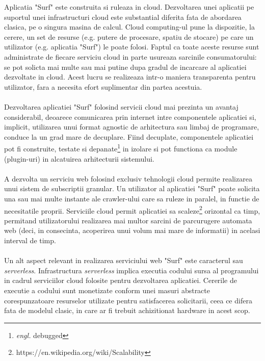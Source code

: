 Aplicatia "Surf" este construita si ruleaza in cloud. Dezvoltarea unei aplicatii pe suportul unei infrastructuri cloud este substantial diferita fata de abordarea clasica, pe o singura masina de calcul. Cloud computing-ul pune la dispozitie, la cerere, un set de resurse (e.g. putere de procesare, spatiu de stocare) pe care un utilizator (e.g. aplicatia "Surf") le poate folosi. Faptul ca toate aceste resurse sunt administrate de fiecare serviciu cloud in parte usureaza sarcinile consumatorului: se pot solicta mai multe sau mai putine dupa gradul de incarcare al aplicatiei dezvoltate in cloud. Acest lucru se realizeaza intr-o maniera transparenta pentru utilizator, fara a necesita efort suplimentar din partea acestuia.
\\
\\
Dezvoltarea aplicatiei "Surf" folosind servicii cloud mai prezinta un avantaj considerabil, deoarece comunicarea prin internet intre componentele aplicatiei si, implicit, utilizarea unui format agnostic de arhitectura sau limbaj de programare, conduce la un grad mare de decuplare. Fiind decuplate, componentele aplicatiei pot fi construite, testate si depanate\footnote{\emph{engl.} debugged} in izolare si pot functiona ca module (plugin-uri) in alcatuirea arhitecturii sistemului.
\\
\\
A dezvolta un serviciu web folosind exclusiv tehnologii cloud permite realizarea unui sistem de subscriptii granular. Un utilizator al aplicatiei "Surf" poate solicita una sau mai multe instante ale crawler-ului care sa ruleze in paralel, in functie de necesitatile proprii. Serviciile cloud permit aplicatiei sa scaleze\footnote{https://en.wikipedia.org/wiki/Scalability} orizontal ca timp, permitand utilizatorului realizarea mai multor sarcini de parcurugere automata web (deci, in consecinta, acoperirea unui volum mai mare de informatii) in acelasi interval de timp.
\\
\\
Un alt aspect relevant in realizarea serviciului web "Surf" este caracterul sau \emph{serverless}. Infrastructura \emph{serverless} implica executia codului sursa al programului in cadrul serviciilor cloud folosite pentru dezvoltarea aplicatiei. Cererile de executie a codului sunt monetizate conform unei masuri abstracte corespunzatoare resurselor utilizate pentru satisfacerea solicitarii, ceea ce difera fata de modelul clasic, in care ar fi trebuit achizitionat hardware in acest scop\cite{serverless-characterization}.